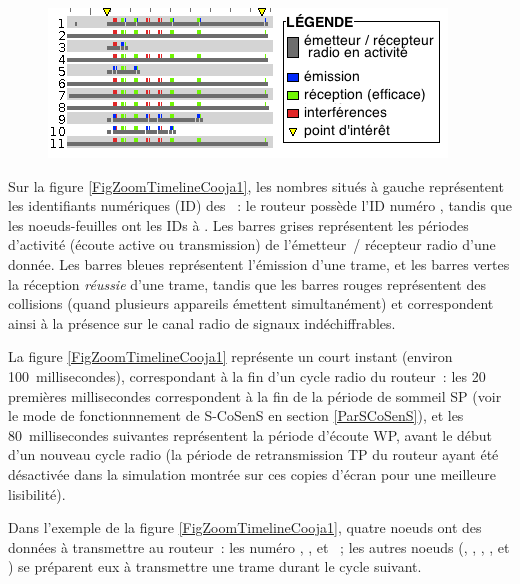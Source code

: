 \begin{figure}[pbt]
\centering
\includegraphics{images/ch5-s-cosens-timeline-1.png}
\label{FigZoomTimelineCooja1}
\end{figure}

Sur la figure \vref{FigZoomTimelineCooja1}, les nombres situés à gauche
représentent les identifiants numériques (ID) des ~: le routeur
possède l'ID numéro , tandis que les noeuds-feuilles ont les IDs
 à . Les barres grises représentent les périodes
d'activité (écoute active ou transmission) de l'émetteur~/ récepteur radio
d'une  donnée. Les barres bleues représentent l'émission d'une
trame, et les barres vertes la réception \emph{réussie} d'une trame,
tandis que les barres rouges représentent des collisions (quand plusieurs
appareils émettent simultanément) et correspondent ainsi à la présence
sur le canal radio de signaux indéchiffrables.

La figure \vref{FigZoomTimelineCooja1} représente un court instant
(environ 100~millisecondes), correspondant à la fin d'un cycle radio du
routeur~: les 20 premières millisecondes correspondent à la fin de la
période  de sommeil SP (voir le mode de fonctionnnement de S-CoSenS en
section \vref{ParSCoSenS}), et les 80~millisecondes suivantes
représentent la période d'écoute WP, avant le début d'un nouveau cycle
radio (la période de retransmission TP du routeur ayant été désactivée
dans la simulation montrée sur ces copies d'écran pour une meilleure
lisibilité).

Dans l'exemple de la figure \vref{FigZoomTimelineCooja1}, quatre noeuds
ont des données à transmettre au routeur~: les  numéro ,
,  et ~; les autres noeuds (,
, , ,  et ) se préparent
eux à transmettre une trame durant le cycle suivant.

